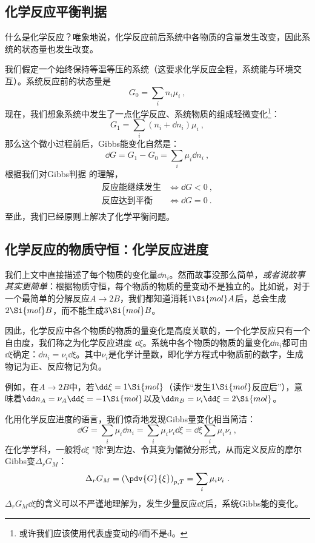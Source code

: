 
\begin{issues}
\issueDraft
\end{issues}


\subsection{化学反应平衡判据}
什么是化学反应？唯象地说，化学反应前后系统中各物质的含量发生改变，因此系统的状态量也发生改变。

我们假定一个始终保持等温等压的系统（这要求化学反应全程，系统能与环境交互）。系统反应前的状态量是 
$$G_0 = \sum_i n_i \mu_i~,$$
现在，我们想象系统中发生了一点化学反应、系统物质的组成轻微变化\footnote{或许我们应该使用代表虚变动的$\delta$而不是$\mathrm{d}$。}：
$$G_1 = \sum_i (n_i + \dd n_i) \mu_i~,$$
那么这个微小过程前后，Gibbs能变化自然是：
$$\dd G = G_1 - G_0 = \sum_i \mu_i \dd n_i~,$$
根据我们对Gibbs判据  的理解，
$$
\begin{aligned}
\text{反应能继续发生} &\Longleftrightarrow \dd G < 0~,\\
\text{反应达到平衡} &\Longleftrightarrow \dd G = 0~.\\
\end{aligned}
$$
至此，我们已经原则上解决了化学平衡问题。

\subsection{化学反应的物质守恒：化学反应进度}
我们上文中直接描述了每个物质的变化量$\dd n_i$。然而故事没那么简单，\textsl{或者说故事其实更简单}：根据物质守恒，每个物质的物质的量变动不是独立的。比如说，对于一个最简单的分解反应$A\to2B$，我们都知道消耗$1 \Si{mol} A$后，总会生成$2 \Si{mol} B$，而不能生成$3 \Si{mol} B$。

因此，化学反应中各个物质的物质的量变化是高度关联的，一个化学反应只有一个自由度，我们称之为化学反应进度 $\dd \xi$。系统中各个物质的物质的量变化$\dd n_i$都可由$\dd \xi$确定：$\dd n_i = \nu_i \dd \xi$。其中$\nu_i$是化学计量数，即化学方程式中物质前的数字，生成物记为正、反应物记为负。

例如，在$A\to2B$中，若$\dd \xi=1 \Si{mol}$（读作“发生$1 \Si{mol}$反应后”），意味着$\dd n_A = \nu_A \dd \xi = - 1 \Si{mol}$以及$\dd n_B = \nu_i \dd \xi = 2 \Si{mol}$。

化用化学反应进度的语言，我们惊奇地发现Gibbs量变化相当简洁：
$$\dd G = \sum_i \mu_i \dd n_i = \sum_i \mu_i \nu_i \dd \xi =  \dd \xi \sum_i \mu_i \nu_i~,$$
在化学学科，一般将$\dd \xi$ "除"到左边、令其变为偏微分形式，从而定义反应的摩尔Gibbs变$\Delta_r G_M$：
$$\Delta_r G_M = \left(\pdv{G}{\xi}\right)_{p,T} = \sum_i \mu_i \nu_i~.$$
$\Delta_r G_M \dd \xi$的含义可以不严谨地理解为，发生少量反应$\dd \xi$后，系统Gibbs能的变化。

